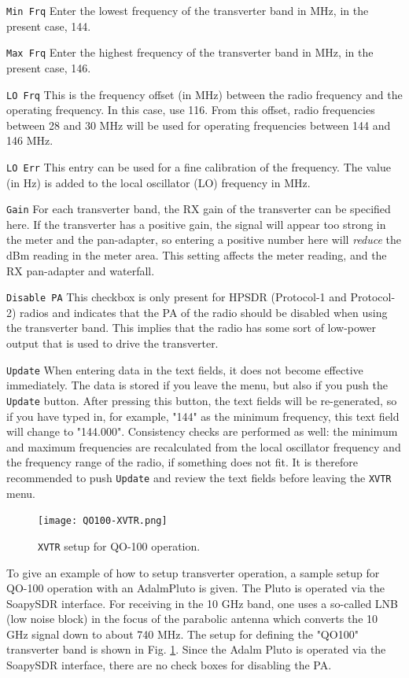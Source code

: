 \documentclass[12pt]{book}
\def\rett#1{\texttt{\color{red}#1}}
\def\bltt#1{\texttt{\color{blue}#1}}
\begin{document}
\rett{Min Frq} Enter the lowest frequency of the transverter band in MHz,
in the present case, 144.

\rett{Max Frq} Enter the highest frequency of the transverter band in MHz,
in the present case, 146.

\rett{LO Frq} This is the frequency offset (in MHz) between the radio frequency and
the operating frequency. In this case, use 116. From this offset, radio frequencies
between 28 and 30 MHz will be used for operating frequencies between 144 and 146 MHz.

\rett{LO Err} This entry can be used for a fine calibration of the frequency. The value
(in Hz) is added to the local oscillator (LO) frequency in MHz.

\rett{Gain} For each transverter band, the RX gain of the transverter can be specified here.
If the transverter has a positive gain, the signal will appear too strong in the
meter and the pan-adapter, so
entering a positive number here will \textit{reduce} the dBm reading in the meter area.
This setting affects the meter reading, and the RX pan-adapter and waterfall.

\rett{Disable PA} This checkbox is only present for HPSDR (Protocol-1 and Protocol-2) radios and
indicates that the PA of the radio should be disabled
when using the transverter band. This implies that the radio has some sort of
low-power output that is used to drive the transverter.

\rett{Update} When entering data in the text fields, it does not become effective
immediately. The data is stored if you leave the menu, but also if you push the
\rett{Update} button. After pressing this button, the text fields will be re-generated,
so if you have typed in, for example, "144" as the minimum frequency, this text field
will change to "144.000". Consistency checks are performed as well: the minimum and maximum
frequencies are recalculated from the local oscillator frequency and the frequency range
of the radio, if something does not fit. It is therefore recommended to push
\rett{Update} and review the text fields before leaving the \bltt{XVTR} menu.

\begin{figure}[h!]
\center
\texttt{[image: QO100-XVTR.png]}
\caption{\bltt{XVTR} setup for QO-100 operation.}
\label{fig:QO100-XVTR}
\end{figure}

To give an example of how to setup transverter operation, a sample setup for QO-100 operation
with an AdalmPluto is given.
The Pluto is
operated via the SoapySDR interface. For receiving in the 10 GHz band, one uses a so-called
LNB (low noise block) in the focus of the parabolic antenna which converts the 10 GHz signal down
to about 740 MHz. The setup for defining the "QO100" transverter band is shown in Fig.
\ref{fig:QO100-XVTR}. Since the Adalm Pluto is operated via the SoapySDR interface, there are no check boxes
for disabling the PA.
\end{document}
